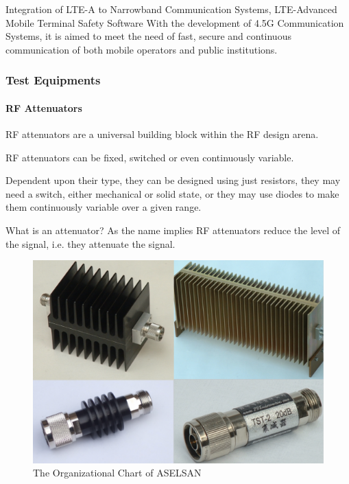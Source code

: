 	Integration of LTE-A to Narrowband Communication Systems,
LTE-Advanced Mobile Terminal Safety Software  
With the development of 4.5G Communication Systems, it is aimed to meet the need of fast, secure and continuous communication of both mobile operators and public institutions.




\subsubsection{Test Equipments} 

\paragraph{RF Attenuators}

	RF attenuators are a universal building block within the RF design arena.

RF attenuators can be fixed, switched or even continuously variable.

Dependent upon their type, they can be designed using just resistors, they may need a switch, either mechanical or solid state, or they may use diodes to make them continuously variable over a given range.

What is an attenuator?
As the name implies RF attenuators reduce the level of the signal, i.e. they attenuate the signal.

\begin{figure}[H]
	\center
	\setlength{\unitlength}{\textwidth} 
	\includegraphics[width=0.75\unitlength]{attn}
	\caption{\label{fig:attn}The Organizational Chart of ASELSAN }
\end{figure}

